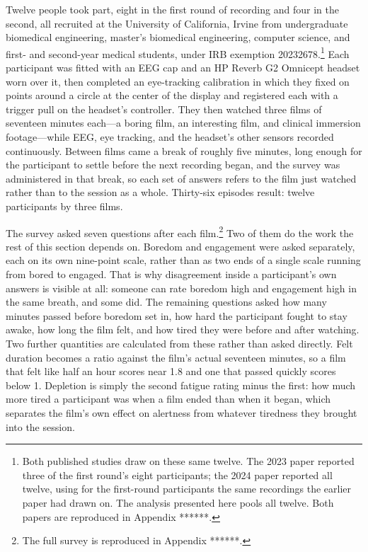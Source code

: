 Twelve people took part, eight in the first round of recording and four in the second, all
recruited at the University of California, Irvine from undergraduate biomedical engineering,
master's biomedical engineering, computer science, and first- and second-year medical
students, under IRB exemption 20232678.\footnote{Both published studies draw on these same
twelve. The 2023 paper reported three of the first round's eight participants; the 2024 paper
reported all twelve, using for the first-round participants the same recordings the earlier
paper had drawn on. The analysis presented here pools all twelve. Both papers are reproduced
in Appendix ******.} Each participant was fitted with an EEG cap and an HP Reverb G2 Omnicept
headset worn over it, then completed an eye-tracking calibration in which they fixed on points
around a circle at the center of the display and registered each with a trigger pull on the
headset's controller. They then
watched three films of seventeen minutes each---a boring film, an interesting film, and
clinical immersion footage---while EEG, eye tracking, and the headset's other sensors recorded
continuously. Between films came a break of roughly five minutes, long enough for the
participant to settle before the next recording began, and the survey was administered in that
break, so each set of answers refers to the film just watched rather than to the session as a
whole. Thirty-six episodes result: twelve participants by three films.

The survey asked seven questions after each film.\footnote{The full survey is reproduced in Appendix ******.} Two of them do the work the rest of this section depends on. Boredom and
engagement were asked separately, each on its own nine-point scale, rather than as two ends of a
single scale running from bored to engaged. That is why disagreement inside a participant's own
answers is visible at all: someone can rate boredom high and engagement high in the same breath,
and some did. The remaining questions asked how many minutes passed before boredom set in, how
hard the participant fought to stay awake, how long the film felt, and how tired they were
before and after watching. Two further quantities are calculated from these rather than asked
directly. Felt duration becomes a ratio against the film's actual seventeen minutes, so a film
that felt like half an hour scores near 1.8 and one that passed quickly scores below 1.
Depletion is simply the second fatigue rating minus the first: how much more tired a participant
was when a film ended than when it began, which separates the film's own effect on alertness
from whatever tiredness they brought into the session.

